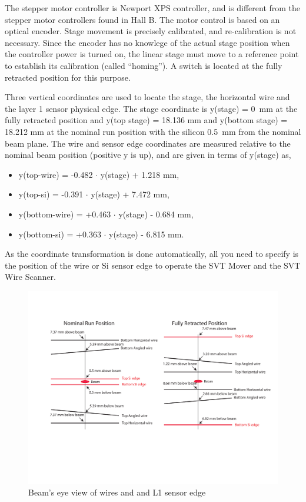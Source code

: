 \documentclass[12pt]{report}
\begin{document}
The stepper motor controller is Newport XPS controller, and is different from the stepper motor controllers found in Hall B. The motor control is based on an optical encoder. Stage movement is precisely calibrated, and re-calibration is not necessary. Since the encoder has no knowlege of the actual stage position when the controller power is turned on, the linear stage must move to a reference point to establish its calibration (called ``homing''). A switch is located at the fully retracted position for this purpose. 

Three vertical coordinates are used to locate the stage, the horizontal wire and the layer 1 sensor physical edge. The stage coordinate is y(stage) = 0~mm at the fully retracted position and y(top stage) = 18.136 mm  and y(bottom stage) = 18.212 mm at the nominal run position with the silicon 0.5~mm from the nominal beam plane. The wire and sensor edge coordinates are measured relative to the nominal beam position (positive y is up), and are given in terms of y(stage) as,

\begin{itemize}
\item
y(top-wire) = -0.482 $\cdot$ y(stage) + 1.218 mm,
\item
y(top-si) = -0.391 $\cdot$ y(stage) + 7.472 mm,
\item
y(bottom-wire) = +0.463 $\cdot$ y(stage) - 0.684 mm,
\item
y(bottom-si) = +0.363 $\cdot$ y(stage) - 6.815 mm.
\end{itemize}

As the coordinate transformation is done automatically, all you need to specify is the position of the wire or Si sensor edge to operate the SVT Mover and the SVT Wire Scanner. 

\begin{figure}[ht!]
\centering
\includegraphics[width=15cm]{WireFrame2.pdf}
\caption{Beam's eye view of wires and and L1 sensor edge}
\label{fig:beam}
\end{figure}
\end{document}
